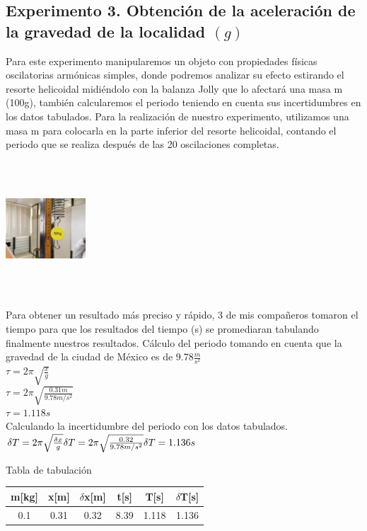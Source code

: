 \documentclass[10pt]{article}
\begin{document}
\begin{multicols}{2}
\section{Experimento 3.  Obtención de la aceleración de la gravedad de la localidad $(g)$}
Para este experimento manipularemos un objeto con propiedades físicas oscilatorias armónicas simples, donde podremos analizar su efecto estirando el resorte helicoidal midiéndolo con la balanza Jolly que lo afectará una masa m (100g), también calcularemos el periodo teniendo en cuenta sus incertidumbres en los datos tabulados. 
Para la realización de nuestro experimento, utilizamos una masa m para colocarla en la parte inferior del resorte helicoidal, contando el periodo que se realiza después de las 20 oscilaciones completas.
\begin{center}
	\includegraphics[width=3cm, height=5cm]{Imagenes/100gr.jpeg}
\end{center}
Para obtener un resultado más preciso y rápido, 3 de mis compañeros tomaron el tiempo para que los resultados del tiempo (s) se promediaran tabulando finalmente nuestros resultados. 
Cálculo del periodo tomando en cuenta que la gravedad de la ciudad de México es de 9.78$\frac{m}{s^{2}}$\\
$\tau = 2\pi \sqrt{\frac{x}{g}}$\\
$\tau = 2\pi \sqrt{\frac{0.31 m}{9.78 m/s^2 }}$\\

$\tau =1.118s$\\
Calculando la incertidumbre del periodo con los datos tabulados. \\
$
\delta T = 2\pi \sqrt{\frac{\delta x}{g}}\\
\delta T = 2\pi \sqrt{\frac{0.32}{9.78 m/s^2}}\\
\delta T = 1.136s\\ $

Tabla de tabulación 


\begin{center}
	\begin{adjustbox}{width=245pt}
		\begin{tabular}{|c|c|c|c|c|c|}
			\hline
			m[kg] & x[m] & $\delta$x[m] & t[s]  &T[s] &$\delta$T[s]\\
			\hline
			0.1  & 0.31 & 0.32 & 8.39 &1.118  &1.136  \\
			\hline
	

\end{tabular}
\end{adjustbox}
\end{center}
\end{multicols}
\end{document}
